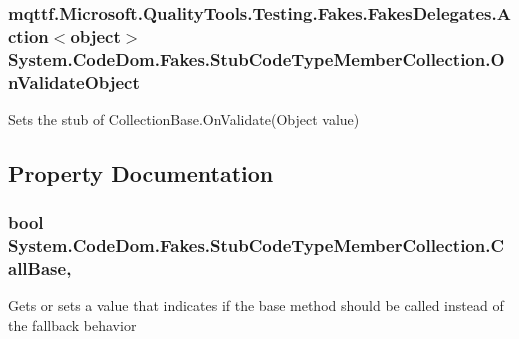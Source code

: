\hypertarget{class_system_1_1_code_dom_1_1_fakes_1_1_stub_code_type_member_collection_a2f00a1394d46f02cb6a92b66ff50131c}{
\subsubsection[{On\-Validate\-Object}]{\setlength{\rightskip}{0pt plus 5cm}mqttf.\-Microsoft.\-Quality\-Tools.\-Testing.\-Fakes.\-Fakes\-Delegates.\-Action$<$object$>$ System.\-Code\-Dom.\-Fakes.\-Stub\-Code\-Type\-Member\-Collection.\-On\-Validate\-Object}}\label{class_system_1_1_code_dom_1_1_fakes_1_1_stub_code_type_member_collection_a2f00a1394d46f02cb6a92b66ff50131c}


Sets the stub of Collection\-Base.\-On\-Validate(\-Object value)



\subsection{Property Documentation}
\hypertarget{class_system_1_1_code_dom_1_1_fakes_1_1_stub_code_type_member_collection_abd1b1d20c14f740bfdb8defff1f82098}{
\subsubsection[{Call\-Base}]{\setlength{\rightskip}{0pt plus 5cm}bool System.\-Code\-Dom.\-Fakes.\-Stub\-Code\-Type\-Member\-Collection.\-Call\-Base\hspace{0.3cm}{\ttfamily [get]}, {\ttfamily [set]}}}\label{class_system_1_1_code_dom_1_1_fakes_1_1_stub_code_type_member_collection_abd1b1d20c14f740bfdb8defff1f82098}


Gets or sets a value that indicates if the base method should be called instead of the fallback behavior

